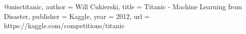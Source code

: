 @misc{titanic,
    author = {Will Cukierski},
    title = {Titanic - Machine Learning from Disaster},
    publisher = {Kaggle},
    year = {2012},
    url = {https://kaggle.com/competitions/titanic}
}